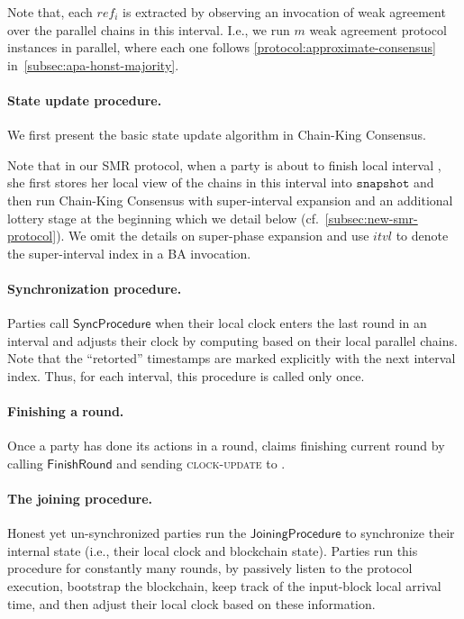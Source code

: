 Note that, each $ref_i$ is extracted by observing an invocation of weak agreement over the parallel chains in this interval.
%
I.e., we run $m$ weak agreement protocol instances in parallel, where each one follows \cref{protocol:approximate-consensus} in~\cref{subsec:apa-honst-majority}.



\paragraph{State update procedure.}
%
We first present the basic state update algorithm in Chain-King Consensus.



Note that in our SMR protocol, when a party \party is about to finish local interval \interval, she first stores her local view of the chains in this interval into $\mathtt{snapshot}$ and then run Chain-King Consensus with super-interval expansion and an additional lottery stage at the beginning which we detail below (cf.~\cref{subsec:new-smr-protocol}).
%
We omit the details on super-phase expansion and use $itvl$ to denote the super-interval index in a BA invocation.



\paragraph{Synchronization procedure.}
%
Parties call $\mathsf{SyncProcedure}$ when their local clock enters the last round in an interval and adjusts their clock by computing \shift based on their local parallel chains.
%
Note that the ``retorted'' timestamps are marked explicitly with the next interval index.
%
Thus, for each interval, this procedure is called only once.



\paragraph{Finishing a round.}
%
Once a party \party has done its actions in a round, \party claims finishing current round by calling $\mathsf{FinishRound}$ and sending \textsc{clock-update} to \funcDriftingClock.



\paragraph{The joining procedure.}
%
Honest yet un-synchronized parties run the $\mathsf{JoiningProcedure}$ to synchronize their internal state (i.e., their local clock and blockchain state).
%
Parties run this procedure for constantly many rounds, by passively listen to the protocol execution, bootstrap the blockchain, keep track of the input-block local arrival time, and then adjust their local clock based on these information.


